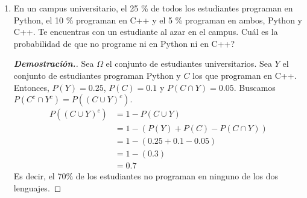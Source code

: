 \documentclass{article}
\begin{document}
\begin{enumerate}
		\begin{mdframed}[
			linecolor=darkgray,
			backgroundcolor=pearl]
			\begin{proof}[\textbf{Demostraci\'on.}]
				Sea $\mathcal D = \{1,2,3,4,5,6\}$. Definimos nuestro espacio muestral como $\Omega = \mathcal D^4$. Entonces, nos interesan los eventos
				\[ 
					A = \{(d_1, d_2, d_3, d_4)\in D^4 : 5 | d_1d_2d_3d_4\}
				\]
				Para que el producto sea divisible entre 5, por descomposici\'on prima, al menos uno debe ser m\'ultiplo de 5 (ya que 5 es primo). Entonces, esto se reduce a la probabilidad de que al menos un dado sea 5. Analicemos el evento contrario: que ning\'un 5 se presente. Como los dados son independientes, que todos sean distintos de 5 se calcula como
				\[ 
					P(C^c) =\frac{5}{6}\cdot \frac{5}{6}\cdot \frac{5}{6}\cdot \frac{5}{6} =  \frac{5^4}{6^4}.
				\]
				Entonces, \[ P(C) = 1 - \frac{5^4}{6^4} \approx 0.518. \]
				
			\end{proof}
		\end{mdframed}
		\pagebreak
		\item En un campus universitario, el 25 \% de todos los estudiantes programan en Python, el 10 \% programan en C++ y el 5 \% programan en ambos, Python y C++. Te encuentras con un estudiante al azar en el campus. Cu\'al es la probabilidad de que no programe ni en Python ni en C++?
		\begin{mdframed}[
			linecolor=darkgray,
			backgroundcolor=pearl]
			\begin{proof}[\textbf{Demostraci\'on.}]
				Sea $\Omega$ el conjunto de estudiantes universitarios. Sea $Y$ el conjunto de estudiantes programan Python y $C$ los que programan en C++. Entonces, $P(Y) = 0.25$, $P(C) = 0.1$ y $P(C\cap Y) = 0.05$. Buscamos $P(C^c\cap Y^c) = P((C\cup Y)^c)$.
				\begin{align*}
					P((C\cup Y)^c) &= 1 - P(C\cup Y) \\
					&= 1 - (P(Y) + P(C) - P(C\cap Y))\\
					&= 1 - (0.25 + 0.1 - 0.05)\\
					&= 1 - (0.3)\\
					&= 0.7
				\end{align*}
				Es decir, el 70\% de los estudiantes no programan en ninguno de los dos lenguajes.				
			\end{proof}
		\end{mdframed}
		
		\vspace{12pt}
		

\end{enumerate}
\end{document}
